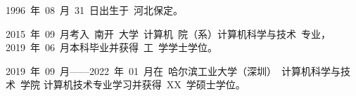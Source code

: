 
\begin{resume}
1996~年~08~月~31~日出生于~河北保定。

2015~年~09~月考入~南开~大学~计算机~院（系）计算机科学与技术~专业，2019~年~06~月本科毕业并获得~工~学学士学位。

2019~年~09~月------2022~年~01~月在~哈尔滨工业大学（深圳）~计算机科学与技术~学院 计算机技术专业学习并获得~XX~学硕士学位。


\end{resume}
